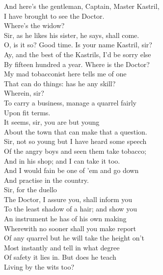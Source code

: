 \documentclass[a4paper,oneside,12pt]{memoir}
\begin{document}
\begin{drama*}
\druggerspeaks And here's the gentleman, Captain, Master Kastril,\\
I have brought to see the Doctor.\\
\facespeaks {} Where's the widow?\\
\druggerspeaks Sir, as he likes his sister, he says, shall come.\\
\facespeaks O, is it so? Good time. Is your name Kastril, sir?\\
\kastrilspeaks Ay, and the best of the Kastrils, I'd be sorry else\\
By fifteen hundred a year. Where is the Doctor?\\
My mad tobacconist here tells me of one\\
That can do things: has he any skill?\\
\facespeaks {} Wherein, sir?\\
\kastrilspeaks To carry a business, manage a quarrel fairly\\
Upon fit terms.\\
\facespeaks {} It seems, sir, you are but young\\
About the town that can make that a question.\\
\kastrilspeaks Sir, not so young but I have heard some speech\\
Of the angry boys and seen them take tobacco;\\
And in his shop; and I can take it too.\\
And I would fain be one of 'em and go down\\
And practise in the country.\\
\facespeaks {} Sir, for the duello\\
The Doctor, I assure you, shall inform you\\
To the least shadow of a hair; and show you\\
An instrument he has of his own making\\
Wherewith no sooner shall you make report\\
Of any quarrel but he will take the height on't\\
Most instantly and tell in what degree\\
Of safety it lies in.
\kastrilspeaks {} But does he teach\\
Living by the wits too?\\

\end{drama*}
\end{document}
